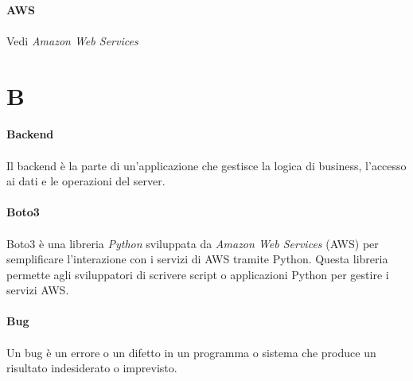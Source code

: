 \documentclass[10pt, a4paper]{article}
\begin{document}
\vspace{2em}
\paragraph{AWS}\noindent\hrulefill
\paragraph{}Vedi \textit{Amazon Web Services\pg}


\newpage
\section{B}
\vspace{2em}
\paragraph{Backend}\noindent\hrulefill
\paragraph{}Il backend è la parte di un'applicazione che gestisce la logica di business, l'accesso ai dati e le operazioni del server.

\vspace{2em}
\paragraph{Boto3}\noindent\hrulefill
\paragraph{}Boto3 è una libreria \textit{Python\pg} sviluppata da \textit{Amazon Web Services\pg} (AWS) per semplificare l'interazione con i servizi di AWS tramite Python. Questa libreria permette agli sviluppatori di scrivere script o applicazioni Python per gestire i servizi AWS.

\vspace{2em}
\paragraph{Bug}\noindent\hrulefill
\paragraph{}Un bug è un errore o un difetto in un programma o sistema che produce un risultato indesiderato o imprevisto.
\end{document}
